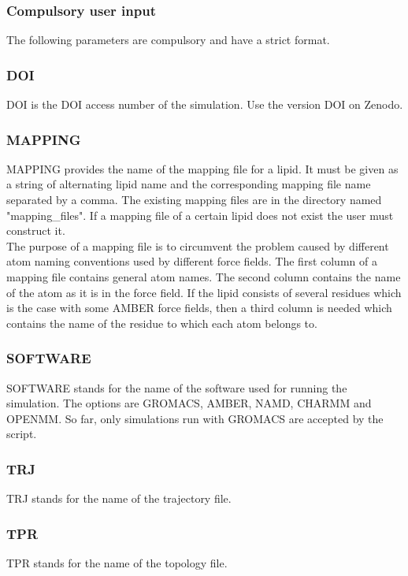 \documentclass[fleqn,10pt]{wlscirep}
\begin{document}
\subsubsection{Compulsory user input}
The following parameters are compulsory and have a strict format.

\subsubsection*{DOI}
DOI is the DOI access number of the simulation. Use the version DOI on Zenodo.

\subsubsection*{MAPPING}
MAPPING provides the name of the mapping file for a lipid. It must be given as a string of alternating lipid name and the corresponding mapping file name separated by a comma. The existing mapping files are in the directory named "mapping\_files". If a mapping file of a certain lipid does not exist the user must construct it.
\newline \\
The purpose of a mapping file is to circumvent the problem caused by different atom naming conventions used by different force fields. The first column of a mapping file contains general atom names. The second column contains the name of the atom as it is in the force field. If the lipid consists of several residues which is the case with some AMBER force fields, then a third column is needed which contains the name of the residue to which each atom belongs to.

\subsubsection*{SOFTWARE}
SOFTWARE stands for the name of the software used for running the simulation. The options are GROMACS, AMBER, NAMD, CHARMM and OPENMM. So far, only simulations run with GROMACS are accepted by the script.

\subsubsection*{TRJ}
TRJ stands for the name of the trajectory file.
\subsubsection*{TPR}
TPR stands for the name of the topology file.
\end{document}
